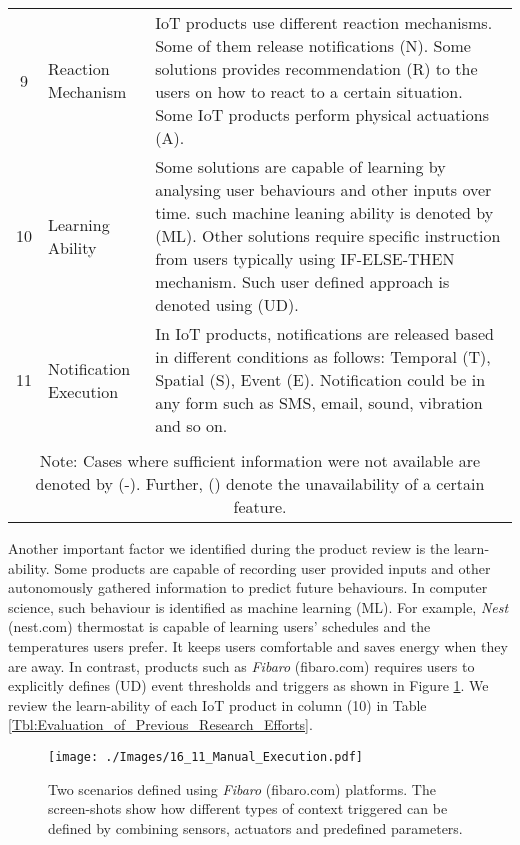 \documentclass[journal]{IEEEtran}
\begin{document}
\begin{table*}[t]
\begin{tabular}{ c l m{13cm} }
9 & Reaction  Mechanism &  IoT products use different reaction mechanisms. Some of them release notifications (N). Some solutions provides recommendation (R) to the users on how to react to a certain situation. Some IoT products perform physical actuations (A).\\
10 & Learning Ability & Some solutions are capable of learning  by analysing user behaviours and other inputs over time. such machine leaning ability is denoted by (ML). Other solutions require specific instruction from users typically using IF-ELSE-THEN mechanism. Such user defined approach is denoted using (UD). \\
11 & Notification Execution &   In IoT products, notifications are released based in different conditions as follows: Temporal (T), Spatial (S), Event (E). Notification could be in any form such as SMS, email, sound, vibration and so on.\\



  \\ \hline
\multicolumn{3}{c}{Note: Cases where sufficient information were not available are denoted by (-). Further, () denote the unavailability of a certain feature.}
\end{tabular}
\label{Tbl:Summarized_taxonmy}
\end{table*}




Another important factor we identified during the product review is the learn-ability. Some products are capable of recording user provided inputs and other autonomously gathered information to predict future behaviours. In computer science, such behaviour is identified as machine learning (ML). For example, \textit{Nest} (nest.com) thermostat is capable of learning users' schedules and the temperatures users prefer. It keeps users comfortable and saves energy when they are away. In contrast, products such as \textit{Fibaro} (fibaro.com) requires users to explicitly  defines (UD) event thresholds and triggers as shown in Figure \ref{Figure:Manual_Execution}. We review the learn-ability of each  IoT product  in column (10) in Table \ref{Tbl:Evaluation_of_Previous_Research_Efforts}.

 
      \begin{figure}[!h]
       \centering
\texttt{[image: ./Images/16\_11\_Manual\_Execution.pdf]}
\caption{Two scenarios defined using \textit{Fibaro} (fibaro.com) platforms. The screen-shots  show how different types of context triggered can be defined by combining sensors, actuators and predefined parameters.}
       \label{Figure:Manual_Execution}	
\end{figure}
   
\end{document}
